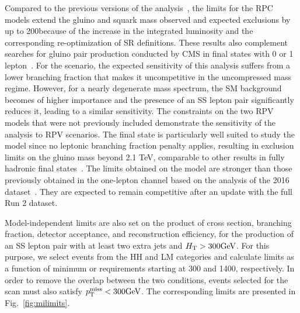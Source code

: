 Compared to the previous versions of the
analysis~\cite{CMS:mySUS2016,CMS:SUS16041}, the limits for the RPC models
extend the gluino and squark mass observed and expected exclusions by up to
200\GeV because of the increase in the integrated luminosity and the
corresponding re-optimization of SR definitions. These results also
complement searches for gluino pair production conducted by CMS in final
states with 0 or 1
lepton~\cite{CMS:2019tlp,CMS:Sirunyan2019ctn,CMS:Sirunyan2019xwh}. 
For the \Totttt
scenario, the expected sensitivity of this analysis suffers from a lower
branching fraction that makes it uncompetitive in the uncompressed mass
regime. However, for a nearly degenerate mass spectrum, the SM background
becomes of higher importance and the presence of an SS lepton pair
significantly reduces it, leading to a similar sensitivity. The constraints
on the two RPV models that were not previously included demonstrate the
sensitivity of the analysis to RPV scenarios. The final state is particularly
well suited to study the \ToqqqqL model since no leptonic branching fraction
penalty applies, resulting in exclusion limits on the gluino mass beyond 2.1
TeV, comparable to other results in fully hadronic final
states~\cite{CMS:Sirunyan2019ctn,CMS:Sirunyan2019xwh}. The limits obtained on the
\Totbs model are stronger than those previously obtained in the one-lepton
channel based on the analysis of the 2016 dataset~\cite{CMS:Sirunyan2017dhe}.
They are expected to remain competitive after an update with the full Run 2
dataset.



Model-independent limits are also set on the product of cross section, branching fraction, detector acceptance, and reconstruction efficiency,
for the production of an SS lepton pair with at least two extra jets and $H_{\mathrm{T}}>300\text{GeV}$.
For this purpose, we select events from the HH and LM categories
and calculate limits as a function of minimum \ptmiss or \HT requirements
starting at 300 and 1400\GeV, respectively.
In order to remove the overlap between the two conditions, events selected for the \HT scan must also satisfy $p_{\mathrm{T}}^\text{miss}<300\text{GeV}$.
The corresponding limits are presented in Fig.~\ref{fig:milimits}.


